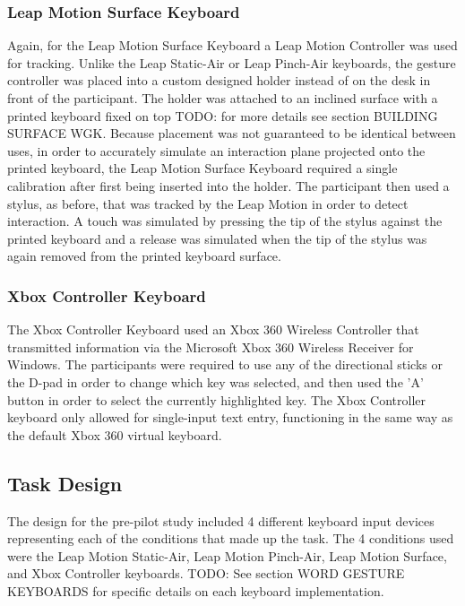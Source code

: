 \subsubsection{Leap Motion Surface Keyboard}
Again, for the Leap Motion Surface Keyboard a Leap Motion Controller was used for tracking. Unlike the Leap Static-Air or Leap Pinch-Air keyboards, the gesture controller was placed into a custom designed holder instead of on the desk in front of the participant. The holder was attached to an inclined surface with a printed keyboard fixed on top TODO: for more details see section BUILDING SURFACE WGK. Because placement was not guaranteed to be identical between uses, in order to accurately simulate an interaction plane projected onto the printed keyboard, the Leap Motion Surface Keyboard required a single calibration after first being inserted into the holder. The participant then used a stylus, as before, that was tracked by the Leap Motion in order to detect interaction. A touch was simulated by pressing the tip of the stylus against the printed keyboard and a release was simulated when the tip of the stylus was again removed from the printed keyboard surface.

\subsubsection{Xbox Controller Keyboard}
The Xbox Controller Keyboard used an Xbox 360 Wireless Controller that transmitted information via the Microsoft Xbox 360 Wireless Receiver for Windows. The participants were required to use any of the directional sticks or the D-pad in order to change which key was selected, and then used the 'A' button in order to select the currently highlighted key. The Xbox Controller keyboard only allowed for single-input text entry, functioning in the same way as the default Xbox 360 virtual keyboard. 

\subsection{Task Design} \label{pre_task}
The design for the pre-pilot study included 4 different keyboard input devices representing each of the conditions that made up the task. The 4 conditions used were the Leap Motion Static-Air, Leap Motion Pinch-Air, Leap Motion Surface, and Xbox Controller keyboards. TODO: See section WORD GESTURE KEYBOARDS for specific details on each keyboard implementation.

